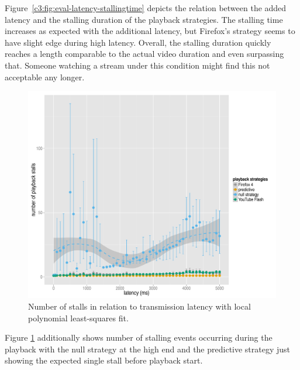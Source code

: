 Figure~\ref{c3:fig:eval-latency-stallingtime} depicts the relation between the added latency and the stalling duration of the playback strategies. The stalling time increases as expected with the additional latency, but Firefox's strategy seems to have slight edge during high latency. Overall, the stalling duration quickly reaches a length comparable to the actual video duration and even surpassing that. Someone watching a stream under this condition might find this not acceptable any longer.


\begin{figure}[htb]
    \centering
    \includegraphics[width=1.0\textwidth]{images/R-playbackemulation-stallnumber-latency.pdf}
    \caption{Number of stalls in relation to transmission latency with local polynomial least-squares fit.}
    \label{c3:fig:eval-latency-numstalls}
\end{figure}

Figure \ref{c3:fig:eval-latency-numstalls} additionally shows number of stalling events occurring during the playback with the null strategy at the high end and the predictive strategy just showing the expected single stall before playback start. %

